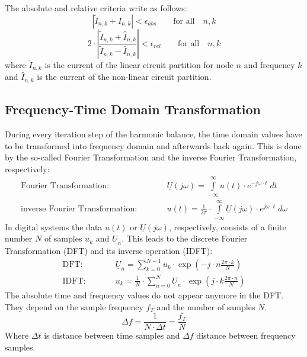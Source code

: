 \addvspace{12pt}

The absolute and relative criteria write as follows:
\begin{equation}
\left| \tilde{I}_{n,k} + \hat{I}_{n,k} \right| < \epsilon_{abs}
  \qquad \text{for all} \quad n, k
\end{equation}
\begin{equation}
2\cdot \left| \frac{\tilde{I}_{n,k} + \hat{I}_{n,k}}
                   {\tilde{I}_{n,k} - \hat{I}_{n,k}} \right|
  < \epsilon_{rel}  \qquad \text{for all} \quad n, k
\end{equation}
where $\tilde{I}_{n,k}$ is the current of the linear circuit
partition for node $n$ and frequency $k$ and $\hat{I}_{n,k}$
is the current of the non-linear circuit partition.


\subsection{Frequency-Time Domain Transformation}

During every iteration step of the harmonic balance, the time domain
values have to be transformed into frequency domain and afterwards
back again. This is done by the so-called Fourier Transformation and
the inverse Fourier Transformation, respectively:
\begin{eqnarray}
\text{Fourier Transformation:} & \qquad &
     \underline{U}(j\omega) =
     \int\limits_{-\infty}^{\infty} u(t)\cdot e^{-j\omega\cdot t} \; dt \\
\text{inverse Fourier Transformation:} & \qquad &
     u(t) = \frac{1}{2\pi} \cdot \int\limits_{-\infty}^{\infty}
            \underline{U}(j\omega)\cdot e^{j\omega\cdot t} \; d\omega
\end{eqnarray}
In digital systems the data $u(t)$ or $\underline{U}(j\omega)$,
respectively, consists of a finite number $N$ of samples $u_k$ and
$\underline{U}_n$. This leads to the discrete Fourier Transformation
(DFT) and its inverse operation (IDFT):
\begin{eqnarray}
\label{eqn:DFT}
\text{DFT:} & \qquad &
     \underline{U}_n =
     \sum_{k=0}^{N-1} u_k\cdot \exp\left( -j\cdot n\frac{2\pi\cdot k}{N} \right) \\
\label{eqn:IDFT}
\text{IDFT:} & \qquad &
     u_k = \frac{1}{N} \cdot \sum_{n=0}^{N}
            \underline{U}_n\cdot \exp\left( j\cdot k\frac{2\pi\cdot n}{N} \right)
\end{eqnarray}
The absolute time and frequency values do not appear anymore in the DFT.
They depend on the sample frequency $f_T$ and the number of samples $N$.
\begin{equation}
\Delta f = \frac{1}{N\cdot\Delta t} = \frac{f_T}{N}
\end{equation}
Where $\Delta t$ is distance between time samples and $\Delta f$
distance between frequency samples.

